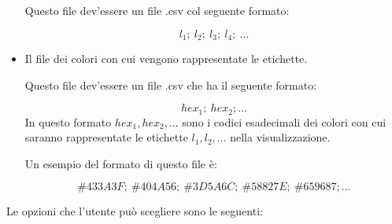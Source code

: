 \documentclass[a4paper,12pt]{report}
\begin{document}
\begin{itemize}
				Questo file dev'essere un file .csv col seguente formato: 

				\begin{equation}
				l_1;\ l_2;\ l_3;\ l_4;\ \dots
				\end{equation}

				\item Il file dei colori con cui vengono rappresentate le etichette. 

				Questo file dev'essere un file .csv che ha il seguente formato: 

				\begin{equation}
				hex_1;\ hex_2; \dots
				\end{equation}
				In questo formato $hex_1, hex_2, \dots$ sono i codici esadecimali dei colori con cui saranno rappresentate le etichette $l_1, l_2, \dots$ nella visualizzazione. 

				Un esempio del formato di questo file è: 

				\begin{equation}
				\#433A3F;\ \#404A56;\ \#3D5A6C;\ \#58827E;\ \#659687; \dots
				\end{equation}
			\end{itemize}
			
			Le opzioni che l'utente può scegliere sono le seguenti:
			
\end{document}

